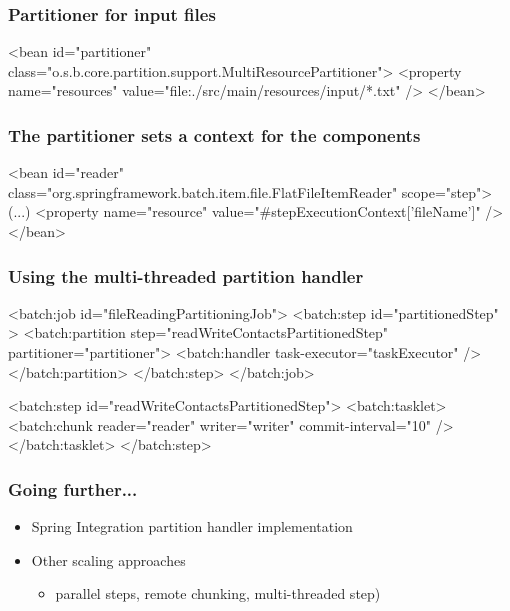 \begin{frame}[fragile]
\frametitle{Partitioner for input files}
\begin{xmlcode}
<bean id="partitioner"
      class="o.s.b.core.partition.support.MultiResourcePartitioner">
  <property name="resources" 
            value="file:./src/main/resources/input/*.txt" />
</bean>
\end{xmlcode}
\end{frame}

\begin{frame}[fragile]
\frametitle{The partitioner sets a context for the components}

\begin{xmlcode}
<bean id="reader" 
      class="org.springframework.batch.item.file.FlatFileItemReader" 
      scope="step">
  (...)
  <property name="resource" 
            value="#{stepExecutionContext['fileName']}" />
</bean>
\end{xmlcode}
\end{frame}

\begin{frame}[fragile]
 \frametitle{Using the multi-threaded partition handler}
 \begin{xmlcode}
<batch:job id="fileReadingPartitioningJob">
  <batch:step id="partitionedStep" >
    <batch:partition step="readWriteContactsPartitionedStep"
                     partitioner="partitioner">
      <batch:handler task-executor="taskExecutor" />
    </batch:partition>
  </batch:step>
</batch:job>

<batch:step id="readWriteContactsPartitionedStep">
  <batch:tasklet>    
    <batch:chunk reader="reader" writer="writer" 
                 commit-interval="10" />
  </batch:tasklet>	
</batch:step>
 \end{xmlcode}
\end{frame}

\begin{frame}
 \frametitle{Going further...}
 \begin{itemize}
  \item Spring Integration partition handler implementation
  \item Other scaling approaches
  \begin{itemize}
   \item parallel steps, remote chunking, multi-threaded step)
  \end{itemize}  
 \end{itemize}
\end{frame}

